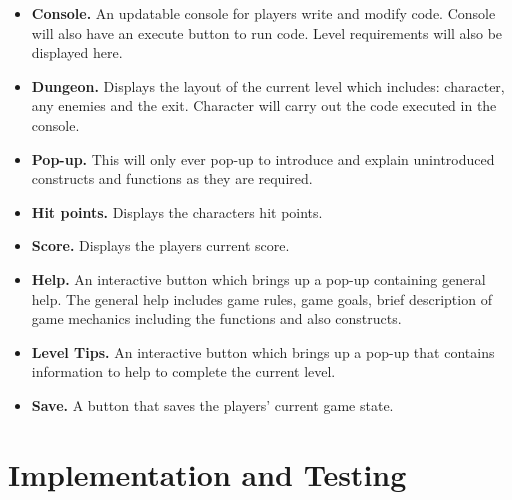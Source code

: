 \documentclass[a4paper,11.5pt]{report}
\numberwithin{figure}{section}
\numberwithin{table}{section}
\numberwithin{equation}{section}
\numberwithin{equation}{section}
\newcommand\blankpage{%
    \null
    \thispagestyle{empty}%
    \addtocounter{page}{-1}%
    \newpage}
\begin{document}
\begin{itemize}

	\item \textbf{Console.} An updatable console for players write and modify code. Console will also have an execute button to run code. Level requirements will also be displayed here.
	\item \textbf{Dungeon.} Displays the layout of the current level which includes: character, any enemies and the exit. Character will carry out the code executed in the console.
	\item \textbf{Pop-up.} This will only ever pop-up to introduce and explain unintroduced constructs and functions as they are required.
	\item \textbf{Hit points.} Displays the characters hit points.
	\item \textbf{Score.} Displays the players current score.
	\item \textbf{Help.} An interactive button which brings up a pop-up containing general help. The general help includes game rules, game goals, brief description of game mechanics including the functions and also constructs.
	\item \textbf{Level Tips.} An interactive button which brings up a pop-up that contains information to help to complete the current level.
	\item \textbf{Save.} A button that saves the players' current game state.

\end{itemize}


\afterpage{\blankpage}


\chapter{Implementation and Testing}

\end{document}

